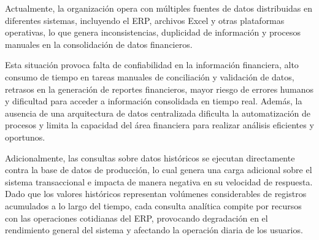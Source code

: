 Actualmente, la organización opera con múltiples fuentes de datos distribuidas en diferentes sistemas, incluyendo el ERP, archivos Excel y otras plataformas operativas, lo que genera inconsistencias, duplicidad de información y procesos manuales en la consolidación de datos financieros. 

Esta situación provoca falta de confiabilidad en la información financiera, alto consumo de tiempo en tareas manuales de conciliación y validación de datos, retrasos en la generación de reportes financieros, mayor riesgo de errores humanos y dificultad para acceder a información consolidada en tiempo real. Además, la ausencia de una arquitectura de datos centralizada dificulta la automatización de procesos y limita la capacidad del área financiera para realizar análisis eficientes y oportunos.

Adicionalmente, las consultas sobre datos históricos se ejecutan directamente contra la base de datos de producción, lo cual genera una carga adicional sobre el sistema transaccional e impacta de manera negativa en su velocidad de respuesta. Dado que los valores históricos representan volúmenes considerables de registros acumulados a lo largo del tiempo, cada consulta analítica compite por recursos con las operaciones cotidianas del ERP, provocando degradación en el rendimiento general del sistema y afectando la operación diaria de los usuarios.
